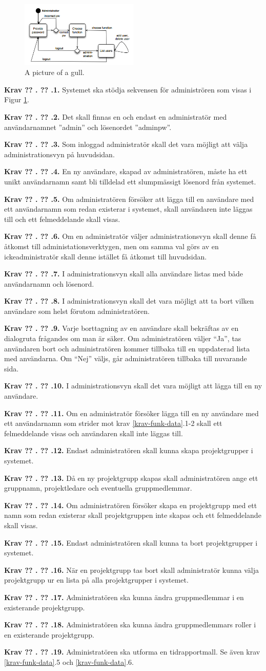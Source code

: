 \documentclass[a4paper]{article}
\newcommand\getcurrentref[1]{%
 \ifnumequal{\value{#1}}{0}
  {??}
  {\the\value{#1}}%
}
\newcommand\requirement[2]{
	\numberedrow{Krav}{#1}{#2}
}
\newcommand\numberedrow[3]{
	\noindent
	\textbf{#1 \getcurrentref{section}.\getcurrentref{subsection}.#2.} #3
	
}
\begin{document}
\begin{figure}[h!]
  \centering
    \includegraphics[width=0.5\textwidth]{admin_usage}
   \caption{A picture of a gull.}
   \label{image_admin_usage}
\end{figure}
\requirement{1}{Systemet ska stödja sekvensen för administrören som visas i Figur \ref{image_admin_usage}.}
\requirement{2}{Det skall finnas en och endast en administratör med användarnamnet ''admin'' och lösenordet ''adminpw''.}
\requirement{3}{Som inloggad administratör skall det vara möjligt att välja administrationsvyn på huvudsidan.}
\requirement{4}{En ny användare, skapad av administratören, måste ha ett unikt användarnamn samt bli tilldelad ett slumpmässigt lösenord från systemet.}
\requirement{5}{Om administratören försöker att lägga till en användare med ett användarnamn som redan existerar i systemet, skall användaren inte läggas till och ett felmeddelande skall visas.}
\requirement{6}{Om en administratör väljer administrationsvyn skall denne få åtkomst till administationsverktygen, men om samma val görs av en ickeadministratör skall denne istället få åtkomst till huvudsidan.}
\requirement{7}{I administrationsvyn skall alla användare listas med både användarnamn och lösenord.}
\requirement{8}{I administrationsvyn skall det vara möjligt att ta bort vilken användare som helst förutom administratören.}
\requirement{9}{Varje borttagning av en användare skall bekräftas av en dialogruta frågandes om man är säker. Om administratören väljer ``Ja'', tas användaren bort och administratören kommer tillbaka till en uppdaterad lista med användarna. Om ``Nej'' väljs, går administratören tillbaka till nuvarande sida.}
\requirement{10}{I administrationsvyn skall det vara möjligt att lägga till en ny användare.}
\requirement{11}{Om en administratör försöker lägga till en ny användare med ett användarnamn som strider mot krav \ref{krav-funk-data}.1-2 skall ett felmeddelande visas och användaren skall inte läggas till.}
\requirement{12}{Endast administratören skall kunna skapa projektgrupper i systemet.}
\requirement{13}{Då en ny projektgrupp skapas skall administratören ange ett gruppnamn, projektledare och eventuella gruppmedlemmar.}
\requirement{14}{Om administratören försöker skapa en projektgrupp med ett namn som redan existerar skall projektgruppen inte skapas och ett felmeddelande skall visas.}
\requirement{15}{Endast administratören skall kunna ta bort projektgrupper i systemet.}
\requirement{16}{När en projektgrupp tas bort skall administratör kunna välja projektgrupp ur en lista på alla projektgrupper i systemet.}
\requirement{17}{Administratören ska kunna ändra gruppmedlemmar i en existerande projektgrupp.}
\requirement{18}{Administratören ska kunna ändra gruppmedlemmars roller i en existerande projektgrupp.}
\requirement{19}{Administratören ska utforma en tidrapportmall. Se även krav \ref{krav-funk-data}.5 och \ref{krav-funk-data}.6.}
\end{document}
